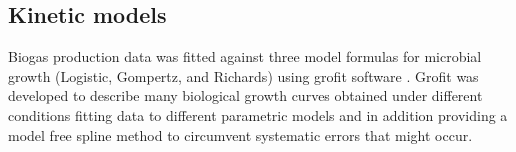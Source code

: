 \subsection{Kinetic models}
Biogas production data was fitted against three model formulas for microbial growth (Logistic, Gompertz, and Richards) using grofit software \cite{Kahm_2010}. Grofit was developed to describe many biological growth curves obtained under different conditions fitting data to different parametric models and in addition providing a model free spline method to circumvent systematic errors that might
occur.